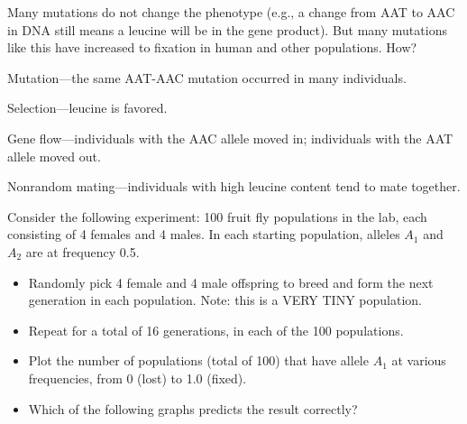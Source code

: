 \begin{frame}
    \begin{clickerquestion}
        \item
            Many mutations do not change the phenotype (e.g., a change from AAT
            to AAC in DNA still means a leucine will be in the gene product).
            But many mutations like this have increased to fixation in human
            and other populations. How?

        \begin{clickeroptions}
            \item Mutation---the same AAT-AAC mutation occurred in many individuals.
            \item Selection---leucine is favored.
            \item {}
            \item Gene flow---individuals with the AAC allele moved in;
                individuals with the AAT allele moved out.
            \item Nonrandom mating---individuals with high leucine content tend
                to mate together.
        \end{clickeroptions}
    \end{clickerquestion}
\end{frame}

\begin{frame}
    \begin{clickerquestion}
        \item
            Consider the following experiment: 100 fruit fly populations in the
            lab, each consisting of 4 females and 4 males. In each starting
            population, alleles $A_1$ and $A_2$ are at frequency 0.5.
 
        \begin{itemize}
            \item Randomly pick 4 female and 4 male offspring to breed and form
                the next generation in each population. Note: this is a VERY
                TINY population. 

            \item Repeat for a total of 16 generations, in each of the 100
                populations.

            \item Plot the number of populations (total of 100) that have
                allele $A_1$ at various frequencies, from 0 (lost) to 1.0
                (fixed). 

            \item Which of the following graphs predicts the result correctly? 
        \end{itemize}

    \end{clickerquestion}
\end{frame}

